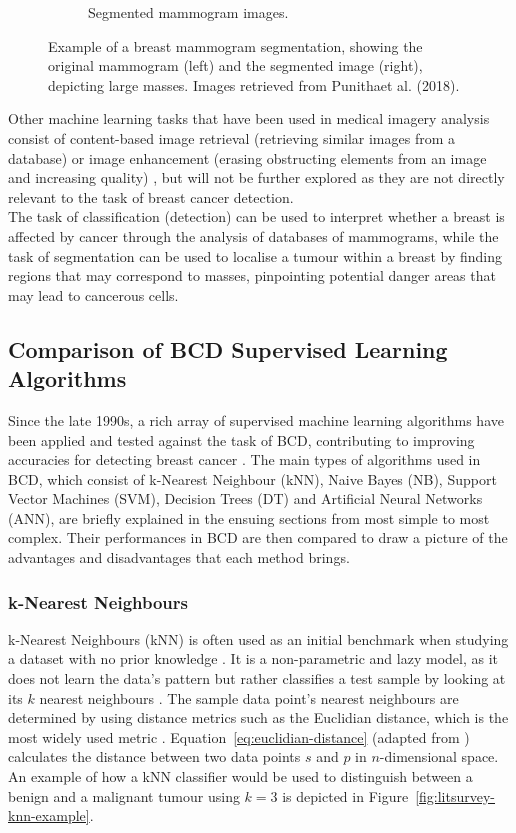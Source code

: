 \begin{figure}[h]
\begin{subfigure}{.5\textwidth}
  \caption{Segmented mammogram images.}
  \label{fig:segmented-mammogram}
\end{subfigure}
\caption{\label{fig:segmentation_example}Example of a breast mammogram segmentation, showing the original mammogram (left) and the segmented image (right), depicting large masses. Images retrieved from Punithaet al. (2018).}
\end{figure}

Other machine learning tasks that have been used in medical imagery analysis consist of content-based image retrieval (retrieving similar images from a database) or image enhancement (erasing obstructing elements from an image and increasing quality) \citep{Litjens2017}, but will not be further explored as they are not directly relevant to the task of breast cancer detection.\\

The task of classification (detection) can be used to interpret whether a breast is affected by cancer through the analysis of databases of mammograms, while the task of segmentation can be used to localise a tumour within a breast by finding regions that may correspond to masses, pinpointing potential danger areas that may lead to cancerous cells.

\subsection{Comparison of BCD Supervised Learning Algorithms}

Since the late 1990s, a rich array of supervised machine learning algorithms have been applied and tested against the task of BCD, contributing to improving accuracies for detecting breast cancer \citep{Yue2018}. The main types of algorithms used in BCD, which consist of k-Nearest Neighbour (kNN), Naive Bayes (NB), Support Vector Machines (SVM), Decision Trees (DT) and Artificial Neural Networks (ANN), are briefly explained in the ensuing sections from most simple to most complex. Their performances in BCD are then compared to draw a picture of the advantages and disadvantages that each method brings.

\subsubsection{k-Nearest Neighbours}
\label{sec:litreview-knn}

k-Nearest Neighbours (kNN) is often used as an initial benchmark when studying a dataset with no prior knowledge \citep{peterson2009k}. It is a non-parametric and lazy model, as it does not learn the data's pattern but rather classifies a test sample by looking at its $k$ nearest neighbours \citep{Yue2018}. The sample data point's nearest neighbours are determined by using distance metrics such as the Euclidian distance, which is the most widely used metric \citep{peterson2009k}. Equation~\ref{eq:euclidian-distance} (adapted from \cite{russell2002artificial}) calculates the distance between two data points $s$ and $p$ in $n$-dimensional space. An example of how a kNN classifier would be used to distinguish between a benign and a malignant tumour using $k=3$ is depicted in Figure~\ref{fig:litsurvey-knn-example}.

